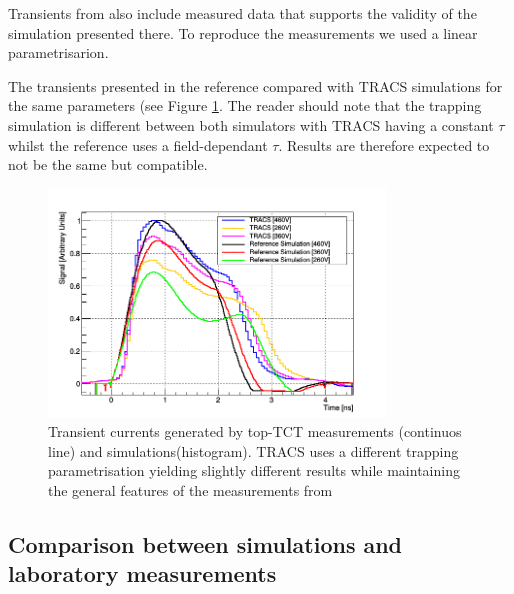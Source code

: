Transients from \cite{Pholsen} also include measured data that supports the validity of the simulation presented there. To reproduce the measurements we used a linear parametrisarion.
%

The transients presented in the reference compared with TRACS simulations for the same parameters (see Figure \ref{fig:PholsenTransient}.  The reader should note that the trapping simulation is different between both simulators with TRACS having a constant $\tau$ whilst the reference uses a field-dependant $\tau$. Results are therefore expected to not be the same but compatible.

\begin{figure}[H]
	\centering
	\includegraphics[width=0.8\textwidth]{Pohlsen_scr.png}
	\caption{Transient currents generated by top-TCT measurements (continuos line) and simulations(histogram). TRACS uses a different trapping parametrisation yielding slightly different results while maintaining the general features of the measurements from \cite{Pholsen}}
	\label{fig:PholsenTransient}
\end{figure}


\subsection{Comparison between simulations and laboratory measurements}


